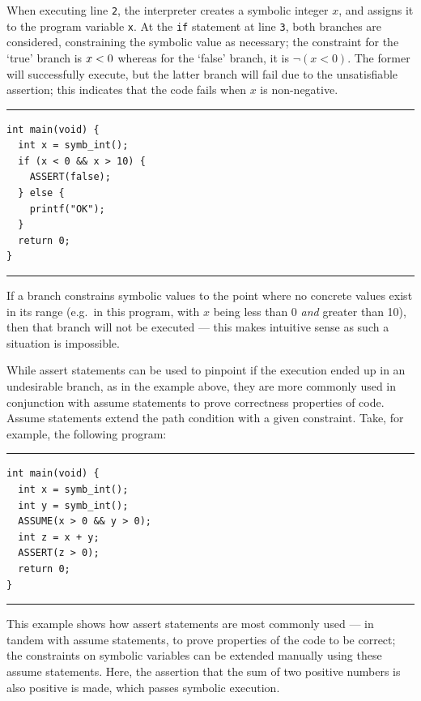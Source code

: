 When executing line \texttt{2}, the interpreter creates a symbolic integer $x$,
and assigns it to the program variable \texttt{x}. At the \texttt{if} statement
at line \texttt{3}, both branches are considered, constraining the symbolic
value as necessary; the constraint for the `true' branch is \texttt{$x < 0$}
whereas for the `false' branch, it is \texttt{$\lnot (x < 0)$}. The former will
successfully execute, but the latter branch will fail due to the unsatisfiable
assertion; this indicates that the code fails when $x$ is non-negative.

\noindent\rule{\textwidth}{0.5pt}
\vspace{-0.6cm}
\begin{verbatim}
int main(void) {
  int x = symb_int();
  if (x < 0 && x > 10) {
    ASSERT(false);
  } else {
    printf("OK");
  }
  return 0;
}
\end{verbatim}
\vspace{-0.4cm}
\noindent\rule{\textwidth}{0.5pt}
\vspace{-0.6cm}
\vspace{0.5cm}

If a branch constrains symbolic values to the point where no concrete values
exist in its range (e.g.\ in this program, with $x$ being less than 0
\textit{and} greater than 10), then that branch will not be executed --- this
makes intuitive sense as such a situation is impossible.

While assert statements can be used to pinpoint if the execution ended up in an
undesirable branch, as in the example above, they are more commonly used in
conjunction with assume statements to prove correctness properties of code.
Assume statements extend the path condition with a given constraint. Take, for
example, the following program:

\noindent\rule{\textwidth}{0.5pt}
\vspace{-0.6cm}
\begin{verbatim}
int main(void) {
  int x = symb_int();
  int y = symb_int();
  ASSUME(x > 0 && y > 0);
  int z = x + y;
  ASSERT(z > 0);
  return 0;
}
\end{verbatim}
\vspace{-0.4cm}
\noindent\rule{\textwidth}{0.5pt}
\vspace{-0.6cm}
\vspace{0.5cm}

This example shows how assert statements are most commonly used --- in tandem
with assume statements, to prove properties of the code to be correct; the
constraints on symbolic variables can be extended manually using these assume
statements. Here, the assertion that the sum of two positive numbers is also
positive is made, which passes symbolic execution.


